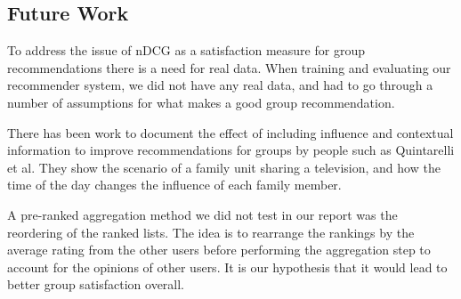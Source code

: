 \subsection{Future Work}

To address the issue of nDCG as a satisfaction measure for group recommendations there is a need for real data. When training and evaluating our recommender system, we did not have any real data, and had to go through a number of assumptions for what makes a good group recommendation.

There has been work to document the effect of including influence and contextual information to improve recommendations for groups by people such as Quintarelli et al\cite{Quintarelli2016}. They show the scenario of a family unit sharing a television, and how the time of the day changes the influence of each family member.



A pre-ranked aggregation method we did not test in our report was the reordering of the ranked lists.
The idea is to rearrange the rankings by the average rating from the other users before performing the aggregation step to account for the opinions of other users. It is our hypothesis that it would lead to better group satisfaction overall.